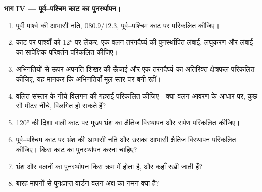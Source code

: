 \begin{problem}
\medskip\noindent\textbf{भाग IV --- पूर्व--पश्चिम काट का पुनर्स्थापन।}
\begin{enumerate}[resume]
  \item पूर्वी पार्श्व की आभासी नति, $080.9/12.3$, पूर्व--पश्चिम काट पर
        परिकलित कीजिए।
  \item काट पर पार्श्वों को \ang{12} पर लेकर, एक वलन-तरंगदैर्घ्य की पुनर्स्थापित
        लंबाई, लघुकरण और लंबाई का सापेक्षिक परिवर्तन
        परिकलित कीजिए।
  \item अभिनतियों से ऊपर अपनति-शिखर की ऊँचाई और
        एक तरंगदैर्घ्य का अतिरिक्त क्षेत्रफल परिकलित कीजिए, यह मानकर कि अभिनतियाँ
        मूल स्तर पर बनी रहीं।
  \item वलित संस्तर के नीचे विलगन की गहराई परिकलित कीजिए। क्या वलन
        आवरण के आधार पर, कुछ सौ मीटर
        नीचे, विलगित हो सकते हैं?
  \item \ang{120} की दिशा वाली काट पर मुख्य भ्रंश का क्षैतिज विस्थापन
        और सर्पण परिकलित कीजिए।
  \item पूर्व--पश्चिम काट पर भ्रंश की आभासी नति और उसका
        आभासी क्षैतिज विस्थापन परिकलित कीजिए। किस काट का पुनर्स्थापन करना चाहिए?
  \item भ्रंश और वलनों का पुनर्स्थापन किस क्रम में होता है, और 
        कहाँ रखी जाती हैं?
  \item बारह मापनों से पुनःप्राप्त वार्डन वलन-अक्ष का नमन
        क्या है?
\end{enumerate}
\end{problem}

